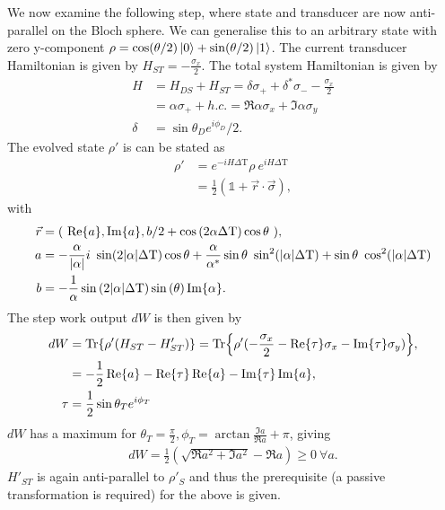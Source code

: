 \documentclass{article}
\begin{document}
We now examine the following step, where state and transducer are now anti-parallel on the Bloch sphere.
We can generalise this to an arbitrary state with zero y-component $\rho = \cos(\theta/2) \ket{0} + \sin(\theta/2) \ket{1}$.
The current transducer Hamiltonian is given by $H_{ST} = -\frac{\sigma_x}{2}$.
The total system Hamiltonian is given by
\begin{align*}
	H &= H_{DS} + H_{ST} =  \delta \sigma_+ + \delta^* \sigma_{-} - \frac{\sigma_x}{2} \\
	  &= \alpha \sigma_+ + h.c. = \Re{\alpha} \sigma_x + \Im{\alpha} \sigma_y \\
	 \delta &= \sin{\theta_D} e^{i\phi_D} / 2.
\end{align*}
The evolved state $\rho'$ is can be stated as
\begin{align*}
	\rho' &= e^{-iH\Delta \mathrm{T}} \rho \ e^{iH\Delta \mathrm{T}} \\
	&=\frac{1}{2} (\mathbb{1} + \vec{r} \cdot \vec{\sigma}),       
\end{align*}
with
\begin{align*}
	\vec{r} &= ( \ \Re{a}, \Im{a},b/2 + \cos{(2 \alpha \Delta \mathrm{T})} \cos{\theta} \ ), \\
	a &= -\frac{\alpha}{\abs{\alpha}} i \ \sin(2 \abs{\alpha} \Delta \mathrm{T}) \cos{\theta} + \frac{\alpha}{\alpha^*} \sin{\theta} \ \sin^2(\abs{\alpha} \Delta \mathrm{T}) + \sin{\theta} \ \cos^2(\abs{\alpha} \Delta \mathrm{T}) \\
	b &= -\frac{1}{\alpha} \sin{(2 \abs{\alpha} \Delta \mathrm{T})} \sin{(\theta)} \Im{\alpha}.
\end{align*}
The step work output $dW$ is then given by
\begin{align*}
	dW &= \Tr{\rho' (H_{ST} - H'_{ST})} = \Tr{\rho' (-\frac{\sigma_x}{2} - \Re{\tau} \sigma_x - \Im{\tau} \sigma_y )}, \\
	   &= -\frac{1}{2} \Re{a} - \Re{\tau}\Re{a} - \Im{\tau} \Im{a}, \\
	\tau &= \frac{1}{2} \sin{\theta_T} e^{i\phi_T}
\end{align*}
$dW$ has a maximum for $\theta_T = \frac{\pi}{2}, \phi_T = \arctan{\frac{\Im{a}}{\Re{a}}} + \pi$, giving
\begin{align*}
	dW = \frac{1}{2}\left(\sqrt{\Re{a}^2 + \Im{a}^2} -\Re{a}\right) \geq 0 \ \forall a.
\end{align*}
$H'_{ST}$ is again anti-parallel to $\rho'_S$ and thus the prerequisite (a passive transformation is required) for the above is given.
\end{document}
